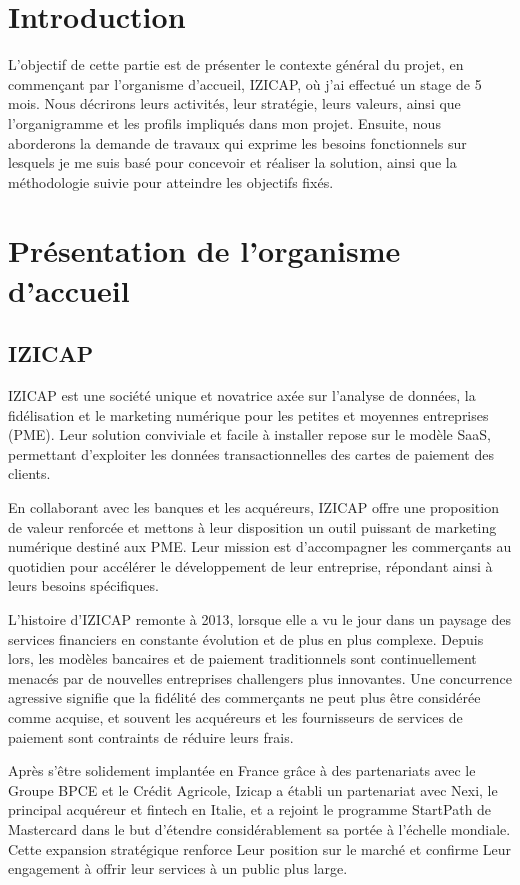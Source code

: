 
\section{Introduction}
L'objectif de cette partie est de présenter le contexte général du projet, en commençant par l'organisme d'accueil, IZICAP, où j'ai effectué un stage de 5 mois. Nous décrirons leurs activités, leur stratégie, leurs valeurs, ainsi que l'organigramme et les profils impliqués dans mon projet. Ensuite, nous aborderons la demande de travaux qui exprime les besoins fonctionnels sur lesquels je me suis basé pour concevoir et réaliser la solution, ainsi que la méthodologie suivie pour atteindre les objectifs fixés.

\section{Présentation de l’organisme d’accueil}
\subsection{IZICAP}
IZICAP est une société unique et novatrice axée sur l'analyse de données, la fidélisation et le marketing numérique pour les petites et moyennes entreprises (PME). Leur solution conviviale et facile à installer repose sur le modèle SaaS, permettant d'exploiter les données transactionnelles des cartes de paiement des clients.

En collaborant avec les banques et les acquéreurs, IZICAP offre une proposition de valeur renforcée et mettons à leur disposition un outil puissant de marketing numérique destiné aux PME. Leur mission est d'accompagner les commerçants au quotidien pour accélérer le développement de leur entreprise, répondant ainsi à leurs besoins spécifiques.

L'histoire d'IZICAP remonte à 2013, lorsque elle a vu le jour dans un paysage des services financiers en constante évolution et de plus en plus complexe. Depuis lors, les modèles bancaires et de paiement traditionnels sont continuellement menacés par de nouvelles entreprises challengers plus innovantes. Une concurrence agressive signifie que la fidélité des commerçants ne peut plus être considérée comme acquise, et souvent les acquéreurs et les fournisseurs de services de paiement sont contraints de réduire leurs frais.

Après s'être solidement implantée en France grâce à des partenariats avec le Groupe BPCE et le Crédit Agricole, Izicap a établi un partenariat avec Nexi, le principal acquéreur et fintech en Italie, et a rejoint le programme StartPath de Mastercard dans le but d'étendre considérablement sa portée à l'échelle mondiale. Cette expansion stratégique renforce Leur position sur le marché et confirme Leur engagement à offrir leur services à un public plus large.

